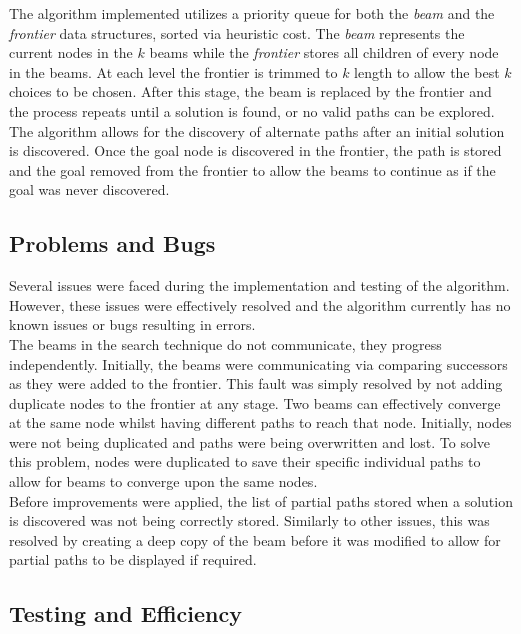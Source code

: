 \documentclass[]{article}
\begin{document}
The algorithm implemented utilizes a priority queue for both the \textit{beam} and the \textit{frontier} data structures, sorted via heuristic cost. The \textit{beam} represents the current nodes in the $k$ beams while the \textit{frontier} stores all children of every node in the beams. At each level the frontier is trimmed to $k$ length to allow the best $k$ choices to be chosen. After this stage, the beam is replaced by the frontier and the process repeats until a solution is found, or no valid paths can be explored. \\

The algorithm allows for the discovery of alternate paths after an initial solution is discovered. Once the goal node is discovered in the frontier, the path is stored and the goal removed from the frontier to allow the beams to continue as if the goal was never discovered.

\subsection*{Problems and Bugs}

Several issues were faced during the implementation and testing of the algorithm. However, these issues were effectively resolved and the algorithm currently has no known issues or bugs resulting in errors.\\

The beams in the search technique do not communicate, they progress independently. Initially, the beams were communicating via comparing successors as they were added to the frontier. This fault was simply resolved by not adding duplicate nodes to the frontier at any stage. Two beams can effectively converge at the same node whilst having different paths to reach that node. Initially, nodes were not being duplicated and paths were being overwritten and lost. To solve this problem, nodes were duplicated to save their specific individual paths to allow for beams to converge upon the same nodes.\\

Before improvements were applied, the list of partial paths stored when a solution is discovered was not being correctly stored. Similarly to other issues, this was resolved by creating a deep copy of the beam before it was modified to allow for partial paths to be displayed if required.\\

\subsection*{Testing and Efficiency}
\end{document}
